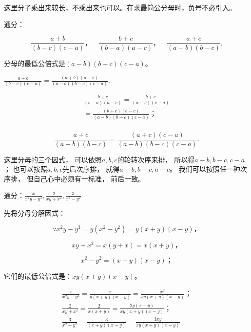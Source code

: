 这里分子乘出来较长，不乘出来也可以。在求最简公分母时，负号不必引入。

 通分：

\[
\frac{a + b}{(b - c) (c - a)}\text{，} \quad \frac{b + c}{(b - a) (a - c)}\text{，} \quad \frac{a + c}{(a - b) (b - c)}.
\]

 分母的最低公倍式是\((a - b)(b - c)(c - a)\)。

\(\frac{a + b}{(b - c)(c - a)} = \frac{(a + b)(a - b)}{(a - b)(b - c)(c - a)};\)

\[
\begin{array}{l} \frac{b + c}{(b - a) (a - c)} = \frac{b + c}{(a - b) (c - a)} \\ = \frac{(b + c) (b - c)}{(a - b) (b - c) (c - a)}\text{；} \\ \end{array}
\]

\[
\frac{a + c}{(a - b) (b - c)} = \frac{(a + c) (c - a)}{(a - b) (b - c) (c - a)}.
\]

 这里分母的三个因式，
可以依照\(a, b, c\)的轮转次序来排， 所以得\(a - b, b - c, c - a\)；
也可以按照\(a, b, c\)先后次序排， 就得\(a - b, b - c, a - c\)。
我们可以按照任一种次序排， 但自己心中必须有一标准， 前后一致。

通分：\(\frac{x}{x^2y - y^3},\frac{2}{xy + x^2},\frac{3}{x^2 - y^2}\)

 先将分母分解因式：

\[
\because x ^{2} y - y ^{3} = y (x ^{2} - y ^{2}) = y (x + y) (x - y)\text{，}
\]

\[
x y + x ^{2} = x (y + x) = x (x + y)\text{，}
\]

\[
x ^{2} - y ^{2} = (x + y) (x - y)\text{；}
\]

它们的最低公倍式是：\(xy(x+y)(x-y)\)。


\[
\begin{array}{l} \frac{x}{x ^{2} y - y ^{3}} = \frac{x}{y (x + y) (x - y)} = \frac{x ^{2}}{x y (x + y) (x - y)}\text{；} \\ \frac{2}{x y + x ^{2}} = \frac{2}{x (x + y)} = \frac{2 y (x - y)}{x y (x + y) (x - y)}\text{；} \\ \frac{3}{x ^{2} - y ^{2}} = \frac{3}{(x + y) (x - y)} = \frac{3 x y}{x y (x + y) (x - y)}. \\ \end{array}
\]

